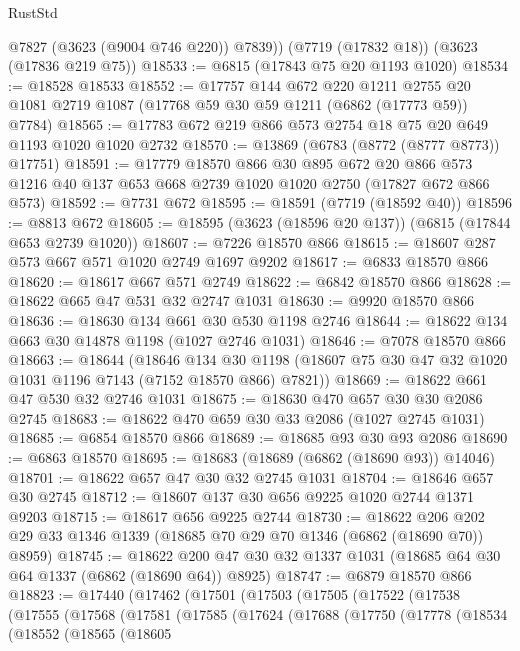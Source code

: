 \begin{lexlean}{RustStd}
\begin{coremodule}
        @7827
        (@3623 (@9004 @746 @220))
        @7839))
    (@7719 (@17832 @18))
    (@3623 (@17836 @219 @75))
@18533 := @6815 (@17843 @75 @20 @1193 @1020)
@18534 := @18528 @18533
@18552 := @17757
    @144
    @672
    @220
    @1211
    @2755
    @20
    @1081
    @2719
    @1087
    (@17768 @59 @30 @59 @1211 (@6862 (@17773 @59)) @7784)
@18565 := @17783 @672 @219 @866 @573 @2754 @18 @75 @20 @649 @1193 @1020 @1020 @2732
@18570 := @13869 (@6783 (@8772 (@8777 @8773)) @17751)
@18591 := @17779
    @18570
    @866
    @30
    @895
    @672
    @20
    @866
    @573
    @1216
    @40
    @137
    @653
    @668
    @2739
    @1020
    @1020
    @2750
    (@17827 @672 @866 @573)
@18592 := @7731 @672
@18595 := @18591 (@7719 (@18592 @40))
@18596 := @8813 @672
@18605 := @18595 (@3623 (@18596 @20 @137)) (@6815 (@17844 @653 @2739 @1020))
@18607 := @7226 @18570 @866
@18615 := @18607 @287 @573 @667 @571 @1020 @2749 @1697 @9202
@18617 := @6833 @18570 @866
@18620 := @18617 @667 @571 @2749
@18622 := @6842 @18570 @866
@18628 := @18622 @665 @47 @531 @32 @2747 @1031
@18630 := @9920 @18570 @866
@18636 := @18630 @134 @661 @30 @530 @1198 @2746
@18644 := @18622 @134 @663 @30 @14878 @1198 (@1027 @2746 @1031)
@18646 := @7078 @18570 @866
@18663 := @18644
    (@18646
      @134
      @30
      @1198
      (@18607 @75 @30 @47 @32 @1020 @1031 @1196 @7143 (@7152 @18570 @866) @7821))
@18669 := @18622 @661 @47 @530 @32 @2746 @1031
@18675 := @18630 @470 @657 @30 @30 @2086 @2745
@18683 := @18622 @470 @659 @30 @33 @2086 (@1027 @2745 @1031)
@18685 := @6854 @18570 @866
@18689 := @18685 @93 @30 @93 @2086
@18690 := @6863 @18570
@18695 := @18683 (@18689 (@6862 (@18690 @93)) @14046)
@18701 := @18622 @657 @47 @30 @32 @2745 @1031
@18704 := @18646 @657 @30 @2745
@18712 := @18607 @137 @30 @656 @9225 @1020 @2744 @1371 @9203
@18715 := @18617 @656 @9225 @2744
@18730 := @18622 @206 @202 @29 @33 @1346 @1339 (@18685 @70 @29 @70 @1346 (@6862 (@18690 @70)) @8959)
@18745 := @18622 @200 @47 @30 @32 @1337 @1031 (@18685 @64 @30 @64 @1337 (@6862 (@18690 @64)) @8925)
@18747 := @6879 @18570 @866
@18823 := @17440
    (@17462
      (@17501
        (@17503
          (@17505
            (@17522
              (@17538
                (@17555
                  (@17568
                    (@17581
                      (@17585
                        (@17624
                          (@17688
                            (@17750
                              (@17778
                                (@18534
                                  (@18552
                                    (@18565
                                      (@18605

\end{coremodule}
\end{lexlean}
